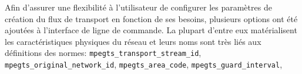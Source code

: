 \documentclass[12pt,a4paper]{article}
\begin{document}
Afin d'assurer une flexibilité à l'utilisateur de configurer les paramètres de création du flux de transport en fonction de ses besoins, plusieurs options ont été ajoutées à l'interface de ligne de commande. La plupart d'entre eux matérialisent les caractéristiques physiques du réseau et leurs noms sont très liés aux définitions des normes:
\texttt{mpegts\hspace{0.1mm}\hspace{0.1mm}\_\hspace{0.1mm}\hspace{0.1mm}transport\hspace{0.1mm}\hspace{0.1mm}\_\hspace{0.1mm}\hspace{0.1mm}stream\hspace{0.1mm}\hspace{0.1mm}\_\hspace{0.1mm}\hspace{0.1mm}id}, \texttt{mpegts\hspace{0.1mm}\hspace{0.1mm}\_\hspace{0.1mm}\hspace{0.1mm}original\hspace{0.1mm}\hspace{0.1mm}\_\hspace{0.1mm}\hspace{0.1mm}network\hspace{0.1mm}\hspace{0.1mm}\_\hspace{0.1mm}\hspace{0.1mm}id}, \texttt{mpegts\hspace{0.1mm}\hspace{0.1mm}\_\hspace{0.1mm}\hspace{0.1mm}area\hspace{0.1mm}\hspace{0.1mm}\_\hspace{0.1mm}\hspace{0.1mm}code}, \texttt{mpegts\hspace{0.1mm}\hspace{0.1mm}\_\hspace{0.1mm}\hspace{0.1mm}guard\hspace{0.1mm}\hspace{0.1mm}\_\hspace{0.1mm}\hspace{0.1mm}interval}, 
\end{document}
